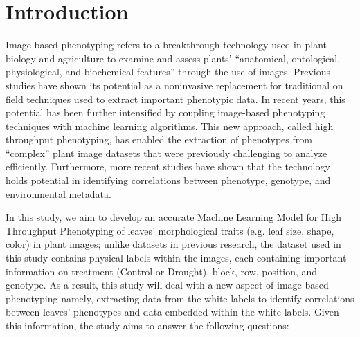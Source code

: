\documentclass[final,5p,times,twocolumn,authoryear]{elsarticle}
\begin{document}



\section{Introduction}
\label{intro}

Image-based phenotyping refers to a breakthrough technology used in plant biology and agriculture to examine and assess plants’ “anatomical, ontological, physiological, and biochemical features” through the use of images. Previous studies have shown its potential as a noninvasive replacement for traditional on field techniques used to extract important phenotypic data. In recent years, this potential has been further intensified by coupling image-based phenotyping techniques with machine learning algorithms. This new approach, called high throughput phenotyping, has enabled the extraction of phenotypes from “complex” plant image datasets that were previously challenging to analyze efficiently. Furthermore, more recent studies have shown that the technology holds potential in identifying correlations between phenotype, genotype, and environmental metadata. 

In this study, we aim to develop an accurate Machine Learning Model for High Throughput Phenotyping of leaves’ morphological traits (e.g. leaf size, shape, color) in plant images; unlike datasets in previous research, the dataset used in this study contains physical labels within the images, each containing important information on treatment (Control or Drought), block, row, position, and genotype. As a result, this study will deal with a new aspect of image-based phenotyping namely, extracting data from the white labels to identify correlations between leaves’ phenotypes and data embedded within the white labels. Given this information, the study aims to answer the following questions: 
\end{document}
